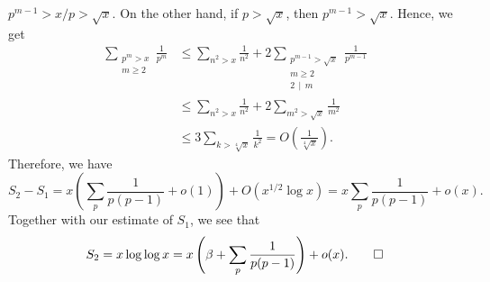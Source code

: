 \begin{pf}
    $p^{m-1} > x/p > \sqrt{x}$. On the other hand, if $p > \sqrt{x}$, then 
    $p^{m-1} > \sqrt{x}$. Hence, we get 
    \begin{align*} 
        \sum_{\substack{p^m > x \\ m \geq 2}} \frac{1}{p^m} 
        &\leq \sum_{n^2 > x} \frac{1}{n^2} + 2 \sum_{\substack{p^{m-1} > \sqrt{x}
        \\ m \geq 2 \\ 2\,\mid\,m}} \frac{1}{p^{m-1}} \\
        &\leq \sum_{n^2 > x} \frac{1}{n^2} + 2 \sum_{m^2 > \sqrt{x}} \frac{1}{m^2} \\ 
        &\leq 3 \sum_{k > \sqrt[4]{x}} \frac{1}{k^2} = O\left( \frac{1}{\sqrt[4]{x}} \right). 
    \end{align*}
    Therefore, we have 
    \[ S_2 - S_1 = x \left( \sum_p \frac{1}{p(p-1)} + o(1) \right) 
    + O(x^{1/2} \log x) = x \sum_p \frac{1}{p(p-1)} + o(x). \] 
    Together with our estimate of $S_1$, we see that 
    \[ S_2 = x\log\log x = x \left( \beta + \sum_p \frac{1}{p(p-1)} \right) 
    + o(x). \qedhere \] 
\end{pf}